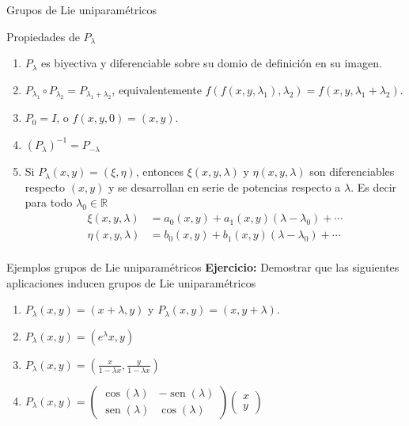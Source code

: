 \documentclass[handout,hyperref={colorlinks=true}]{beamer}
\newcommand{\rr}{\mathbb{R}}
\DeclareMathOperator{\sen}{sen}
\newcommand{\nl}{\onslide<+-> }
\begin{document}
\begin{frame}{Grupos de Lie uniparamétricos}
\nl\begin{block}{Propiedades de $P_{\lambda}$}
\begin{enumerate}
\item<+->$P_{\lambda}$ es biyectiva y diferenciable sobre su domio de definición en su imagen.
 \item<+-> $P_{\lambda_1}\circ P_{\lambda_2}=P_{\lambda_1+\lambda_2}$, equivalentemente $f(f(x,y,\lambda_1),\lambda_2)=f(x,y,\lambda_1+\lambda_2)$.

\item<+-> $P_0=I$, o $f(x,y,0)=(x,y)$.

\item<+-> $\left(P_{\lambda}\right)^{-1}=P_{-\lambda}$

\item<+-> Si $P_{\lambda}(x,y)=(\xi,\eta)$, entonces  $\xi(x,y,\lambda)$ y $\eta(x,y,\lambda)$ son  diferenciables respecto $(x,y)$ y se desarrollan en serie de potencias respecto a $\lambda$. Es decir para todo $\lambda_0\in\rr$ 
\[
\begin{array}{cc}
\xi(x,y,\lambda)&=a_0(x,y)+a_1(x,y)(\lambda- \lambda_0)+\cdots\\
\eta(x,y,\lambda)&=b_0(x,y)+b_1(x,y)(\lambda- \lambda_0)+\cdots\\
\end{array}
\]

\end{enumerate}

\end{block}


\end{frame}


\begin{frame}{Ejemplos grupos de Lie uniparamétricos}
\textbf{Ejercicio:} Demostrar que las siguientes aplicaciones inducen grupos de Lie uniparamétricos
\begin{enumerate}
\item<+-> $P_{\lambda}(x,y)=(x+\lambda,y)$ y $P_{\lambda}(x,y)=(x,y+\lambda)$.
\item<+-> $P_{\lambda}(x,y)=(e^{\lambda}x,y)$
\item<+->$P_{\lambda}(x,y)=\left(\frac{x}{1-\lambda x},\frac{y}{1-\lambda x} \right)$
\item<+->$P_{\lambda}(x,y)=\begin{pmatrix} \cos(\lambda) & -\sen(\lambda)
\\ \sen(\lambda) & \cos(\lambda)
\end{pmatrix} \begin{pmatrix} x\\ y
\end{pmatrix}
$
\end{enumerate}

\end{frame}
\end{document}
